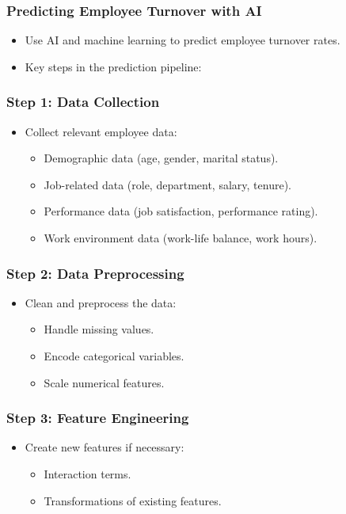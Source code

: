 \documentclass{beamer}
\begin{document}
\begin{frame}
\frametitle{Predicting Employee Turnover with AI}
\begin{itemize}
    \item Use AI and machine learning to predict employee turnover rates.
    \item Key steps in the prediction pipeline:
\end{itemize}
\end{frame}

\begin{frame}
\frametitle{Step 1: Data Collection}
\begin{itemize}
    \item Collect relevant employee data:
        \begin{itemize}
            \item Demographic data (age, gender, marital status).
            \item Job-related data (role, department, salary, tenure).
            \item Performance data (job satisfaction, performance rating).
            \item Work environment data (work-life balance, work hours).
        \end{itemize}
\end{itemize}
\end{frame}

\begin{frame}
\frametitle{Step 2: Data Preprocessing}
\begin{itemize}
    \item Clean and preprocess the data:
        \begin{itemize}
            \item Handle missing values.
            \item Encode categorical variables.
            \item Scale numerical features.
        \end{itemize}
\end{itemize}
\end{frame}

\begin{frame}
\frametitle{Step 3: Feature Engineering}
\begin{itemize}
    \item Create new features if necessary:
        \begin{itemize}
            \item Interaction terms.
            \item Transformations of existing features.
        \end{itemize}
\end{itemize}
\end{frame}
\end{document}
